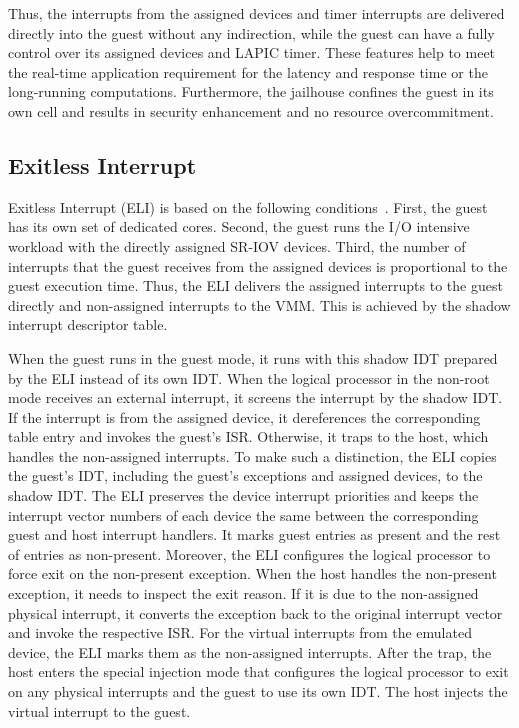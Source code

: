 {Thus, the interrupts from the assigned devices and timer
interrupts are delivered directly into the guest without any
indirection, while the guest can have a fully control over its
assigned devices and LAPIC timer. These features help to meet
the real-time application requirement for the latency and
response time or the long-running computations. Furthermore,
the jailhouse confines the guest in its own cell and results
in security enhancement and no resource overcommitment.

\subsection{Exitless Interrupt}
Exitless Interrupt (ELI) is based on the following
conditions~\cite{amit:2015}. First, the guest has its own set
of dedicated cores. Second, the guest runs the I/O intensive
workload with the directly assigned SR-IOV devices. Third, the
number of interrupts that the guest receives from the assigned
devices is proportional to the guest execution time. Thus, the
ELI delivers the assigned interrupts to the guest directly and
non-assigned interrupts to the VMM. This is achieved by the
shadow interrupt descriptor table.

When the guest runs in the guest mode, it runs with this
shadow IDT prepared by the ELI instead of its own IDT. When
the logical processor in the non-root mode receives an
external interrupt, it screens the interrupt by the shadow
IDT. If the interrupt is from the assigned device, it
dereferences the corresponding table entry and invokes the
guest's ISR. Otherwise, it traps to the host, which handles
the non-assigned interrupts. To make such a distinction, the
ELI copies the guest's IDT, including the guest's exceptions
and assigned devices, to the shadow IDT. The ELI preserves
the device interrupt priorities and keeps the interrupt vector
numbers of each device the same between the corresponding
guest and host interrupt handlers. It marks guest entries as
present and the rest of entries as non-present. Moreover, the
ELI configures the logical processor to force exit on the
non-present exception. When the host handles the non-present
exception, it needs to inspect the exit reason. If it is due
to the non-assigned physical interrupt, it converts the
exception back to the original interrupt vector and invoke the
respective ISR. For the virtual interrupts from the emulated
device, the ELI marks them as the non-assigned interrupts.
After the trap, the host enters the special injection mode
that configures the logical processor to exit on any physical
interrupts and the guest to use its own IDT. The host injects
the virtual interrupt to the guest.

}
